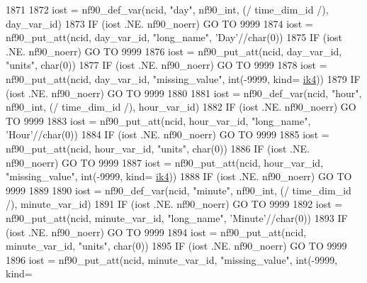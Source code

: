 \begin{DoxyCode}
1871 
1872     iost    = nf90\_def\_var(ncid, \textcolor{stringliteral}{"day"}, nf90\_int, (/ time\_dim\_id /), day\_var\_id)
1873     \textcolor{keywordflow}{IF} (iost .NE. nf90\_noerr) \textcolor{keywordflow}{GO TO} 9999
1874     iost    = nf90\_put\_att(ncid, day\_var\_id, \textcolor{stringliteral}{"long\_name"}, \textcolor{stringliteral}{'Day'}//char(0))
1875     \textcolor{keywordflow}{IF} (iost .NE. nf90\_noerr) \textcolor{keywordflow}{GO TO} 9999
1876     iost    = nf90\_put\_att(ncid, day\_var\_id, \textcolor{stringliteral}{"units"}, char(0))
1877     \textcolor{keywordflow}{IF} (iost .NE. nf90\_noerr) \textcolor{keywordflow}{GO TO} 9999
1878     iost    = nf90\_put\_att(ncid, day\_var\_id, \textcolor{stringliteral}{"missing\_value"}, int(-9999, kind=
      \hyperlink{namespaceportable_aa110cf333432508140602ea192c4b2ea}{ik4}))
1879     \textcolor{keywordflow}{IF} (iost .NE. nf90\_noerr) \textcolor{keywordflow}{GO TO} 9999
1880 
1881     iost    = nf90\_def\_var(ncid, \textcolor{stringliteral}{"hour"}, nf90\_int, (/ time\_dim\_id /), hour\_var\_id)
1882     \textcolor{keywordflow}{IF} (iost .NE. nf90\_noerr) \textcolor{keywordflow}{GO TO} 9999
1883     iost    = nf90\_put\_att(ncid, hour\_var\_id, \textcolor{stringliteral}{"long\_name"}, \textcolor{stringliteral}{'Hour'}//char(0))
1884     \textcolor{keywordflow}{IF} (iost .NE. nf90\_noerr) \textcolor{keywordflow}{GO TO} 9999
1885     iost    = nf90\_put\_att(ncid, hour\_var\_id, \textcolor{stringliteral}{"units"}, char(0))
1886     \textcolor{keywordflow}{IF} (iost .NE. nf90\_noerr) \textcolor{keywordflow}{GO TO} 9999
1887     iost    = nf90\_put\_att(ncid, hour\_var\_id, \textcolor{stringliteral}{"missing\_value"}, int(-9999, kind=
      \hyperlink{namespaceportable_aa110cf333432508140602ea192c4b2ea}{ik4}))
1888     \textcolor{keywordflow}{IF} (iost .NE. nf90\_noerr) \textcolor{keywordflow}{GO TO} 9999
1889 
1890     iost    = nf90\_def\_var(ncid, \textcolor{stringliteral}{"minute"}, nf90\_int, (/ time\_dim\_id /), minute\_var\_id)
1891     \textcolor{keywordflow}{IF} (iost .NE. nf90\_noerr) \textcolor{keywordflow}{GO TO} 9999
1892     iost    = nf90\_put\_att(ncid, minute\_var\_id, \textcolor{stringliteral}{"long\_name"}, \textcolor{stringliteral}{'Minute'}//char(0))
1893     \textcolor{keywordflow}{IF} (iost .NE. nf90\_noerr) \textcolor{keywordflow}{GO TO} 9999
1894     iost    = nf90\_put\_att(ncid, minute\_var\_id, \textcolor{stringliteral}{"units"}, char(0))
1895     \textcolor{keywordflow}{IF} (iost .NE. nf90\_noerr) \textcolor{keywordflow}{GO TO} 9999
1896     iost    = nf90\_put\_att(ncid, minute\_var\_id, \textcolor{stringliteral}{"missing\_value"}, int(-9999, kind=

\end{DoxyCode}

